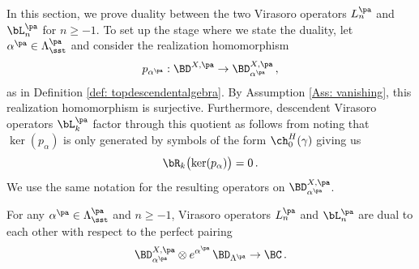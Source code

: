 In this section, we prove duality between the two Virasoro operators $L_n^{\pa}$ and $\bL_n^{\pa}$ for $n\geq -1$. To set up the stage where we state the duality, let $\alpha^{\pa}\in \Lambda_{\sst}^{\pa}$ and consider the realization homomorphism
$$p_{\alpha^{\pa}}:\BD^{X,{\pa}}\rightarrow \BD^{X,\pa}_{\alpha^{\pa}}\,,
$$
as in Definition \ref{def: topdescendentalgebra}. By Assumption \ref{Ass: vanishing}, this realization homomorphism is surjective. Furthermore, descendent Virasoro operators $\bL_k^{\pa}$ factor through this quotient as follows from noting that $\ker(p_{\alpha})$ is only generated by symbols of the form $\ch^H_0(\gamma)$ giving us $$\bR_k\big(\!\ker(p_{\alpha})\big)=0 \,.$$
We use the same notation for the resulting operators on $\BD^{X,\pa}_{\alpha^{\pa}}$.
\begin{theorem}
\notready\label{thm: duality}
For any $\alpha^{\pa}\in \Lambda_{\sst}^{\pa}$ and $n\geq -1$, Virasoro operators $L_n^{\pa}$ and $\bL_n^{\pa}$ are dual to each other with respect to the perfect pairing
$$\BD^{X,\pa}_{\alpha^{\pa}}\otimes e^{\alpha^{\pa}}\, \BD_{\Lambda^{\pa}}\rightarrow \BC\,.
$$
\end{theorem}
